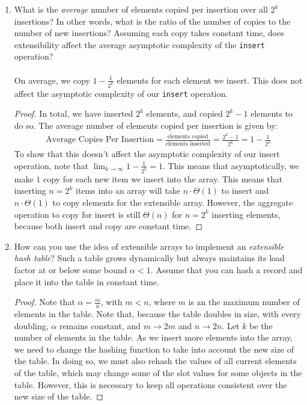 \documentclass[11pt]{article}
\begin{document}
\begin{enumerate}
\begin{enumerate}
\item
What is the \emph{average} number of elements copied per
insertion over all $2^k$ insertions?  In other words,
what is the ratio of the number of copies to the number of new
insertions?  Assuming each copy takes constant time, does 
extensibility affect the average asymptotic complexity of the 
\texttt{insert} operation?
\\ \\
On average, we copy $1-\frac{1}{2^k}$ elements for each element we insert.  This does not affect the asymptotic complexity of our \texttt{insert} operation.
\begin{proof}
In total, we have inserted $2^k$ elements, and copied $2^k-1$ elements to do so.  The average number of elements copied per insertion is given by:
\begin{align*}
\text{Average Copies Per Insertion} = \frac{\text{elements copied}}{\text{elements inserted}}=\frac{2^k-1}{2^k}= 1-\frac{1}{2^k}
\end{align*}
To show that this doesn't affect the asymptotic complexity of our insert operation, note that $\lim_{k \to \infty} 1-\frac{1}{2^k} = 1$.  This means that asymptotically, we make $1$ copy for each new item we insert into the array.  This means that inserting $n=2^k$ items into an array will take $n \cdot \Theta(1)$ to insert and $n \cdot \Theta(1)$ to copy elements for the extensible array.  However, the aggregate operation to copy for insert is still $\Theta(n)$ for $n= 2^k$ inserting elements, because both insert and copy are constant time.   
\end{proof}
\item
How can you use the idea of extensible arrays to implement an
\emph{extensible hash table}?  Such a table grows dynamically but
always maintains its load factor at or below some bound $\alpha < 1$.
Assume that you can hash a record and place it into the table in
constant time.
\begin{proof}
Note that $\alpha = \frac{m}{n}$, with $m<n$, where $m$ is an the maximum number of elements in the table.  Note that, because the table doubles in size, with every doubling, $\alpha$ remains constant, and $ m \to 2m$ and $n \to 2n$.  Let $k$ be the number of elements in the table.  As we insert more elements into the array, we need to change the hashing function to take into account the new size of the table.  In doing so, we must also rehash the values of all current elements of the table, which may change some of the slot values for some objects in the table.  However, this is necessary to keep all operations consistent over the new size of the table. 
\end{proof}
\end{enumerate}
\end{enumerate}
\end{document}
